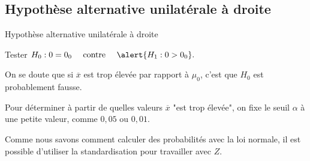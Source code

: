 \documentclass{BeamerTemplate}
\begin{document}
\subsection{Hypothèse alternative unilatérale à droite}

\begin{frame}[t]{Hypothèse alternative unilatérale à droite}

\small
Tester $H_0 : \mu = \mu_0 \quad\mbox{ contre }\quad \alert{H_1 : \mu > \mu_0}.$

\bigskip

On se doute que \alert{si $\overline{x}$ est trop élevée par rapport à $\mu_0$}, c'est que $H_0$  est probablement fausse.

\bigskip

Pour déterminer à partir de quelles valeurs $\overline x$ "est trop élevée", on
fixe le seuil $\alpha$ à une petite valeur, comme $0,05$ ou $0,01$.
\medskip

Comme nous savons comment calculer des probabilités avec la loi normale, il est possible d'utiliser la standardisation pour travailler avec $Z$.

\medskip



\end{frame}
\end{document}
